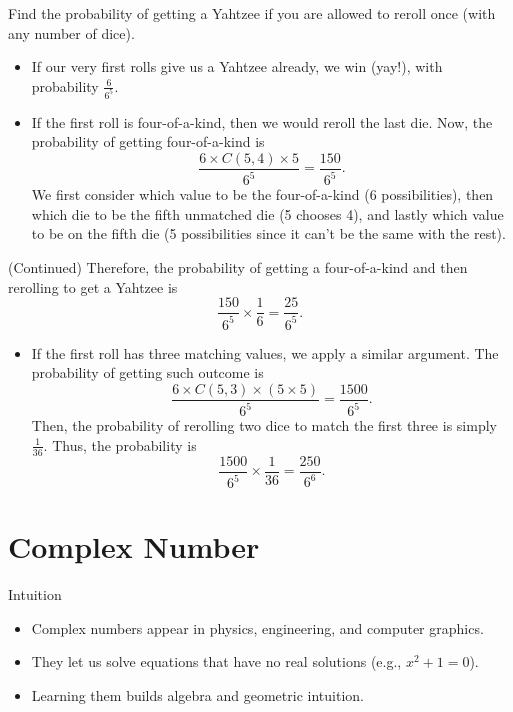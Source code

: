\begin{frame}[t]
\begin{ex}
Find the probability of getting a Yahtzee if you are allowed to reroll once (with any number of dice).
\end{ex}
\begin{sol}
\begin{itemize}
\item If our very first rolls give us a Yahtzee already, we win (yay!), with probability $\frac{6}{6^5}$.
\item If the first roll is four-of-a-kind, then we would reroll the last die. Now, the probability of getting four-of-a-kind is 
\[\frac{6 \times C(5,4) \times 5}{6^5} = \frac{150}{6^5}.\] 
We first consider which value to be the four-of-a-kind (6 possibilities), then which die to be the fifth unmatched die (5 chooses 4), and lastly which value to be on the fifth die (5 possibilities since it can't be the same with the rest).
\end{itemize}
\end{sol}
\end{frame}

\begin{frame}
\begin{sol} (Continued)
Therefore, the probability of getting a four-of-a-kind and then rerolling to get a Yahtzee is 
\[\frac{150}{6^5} \times \frac{1}{6} = \frac{25}{6^5}.\]
\begin{itemize}
\item If the first roll has three matching values, we apply a similar argument. The probability of getting such outcome is 
\[\frac{6 \times C(5,3) \times (5 \times 5)}{6^5} = \frac{1500}{6^5}.\] 
Then, the probability of rerolling two dice to match the first three is simply $\frac{1}{36}$. Thus, the probability is 
\[\frac{1500}{6^5} \times \frac{1}{36} = \frac{250}{6^6}.\]
\end{itemize}
\end{sol}
\end{frame}

\section{Complex Number}
\frame{\sectionpage}

\begin{frame}{Intuition}
  \begin{itemize}
    \item Complex numbers appear in physics, engineering, and computer graphics.
    \item They let us solve equations that have no real solutions (e.g., $x^2+1=0$).
    \item Learning them builds algebra and geometric intuition.
  \end{itemize}
\end{frame}

